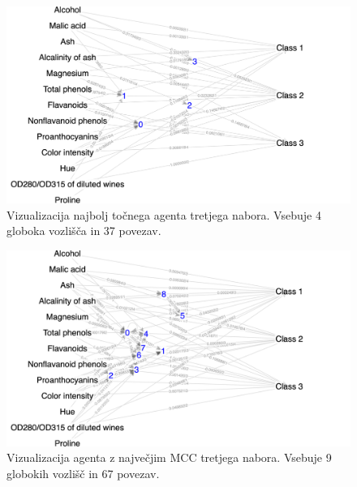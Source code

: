\begin{figure}[H]
    \begin{center}
        \includegraphics[width=13cm]{wine/3/acc_g}
    \end{center}
    \caption{Vizualizacija najbolj točnega agenta tretjega nabora. Vsebuje 4 globoka vozlišča in 37 povezav.}
    \label{fig:wine_acc_3_g}
\end{figure}

\begin{figure}[H]
    \begin{center}
        \includegraphics[width=13cm]{wine/3/mcc_g}
    \end{center}
    \caption{Vizualizacija agenta z največjim MCC tretjega nabora. Vsebuje 9 globokih vozlišč in 67 povezav.}
    \label{fig:wine_mcc_3_g}
\end{figure}

